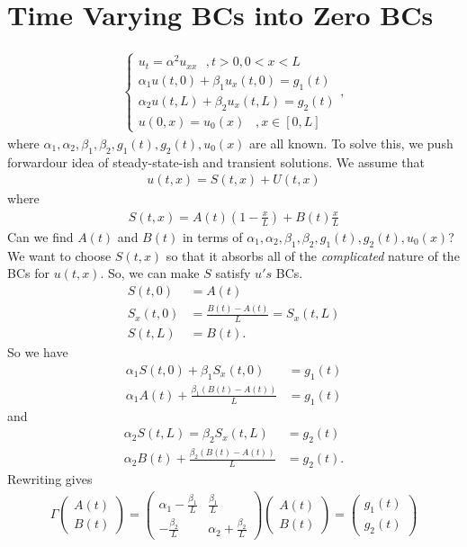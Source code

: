 \documentclass{book}
\theoremstyle{definition}
\begin{document}
\section{Time Varying BCs into Zero BCs}
\begin{align*}
\begin{cases}
u_t = \alpha^2u_{xx}\,\,\,\,, t>0,0<x<L\\
\alpha_1 u(t,0) + \beta_1 u_x(t,0) = g_1(t)\\
\alpha_2 u(t,L) + \beta_2 u_x(t,L) = g_2(t)\\
u(0,x) = u_0(x)\,\,\,\,\,, x\in[0,L]
\end{cases},
\end{align*}
where $\alpha_1,\alpha_2,\beta_1,\beta_2,g_1(t),g_2(t),u_0(x)$ are all known. To solve this, we push forwardour idea of steady-state-ish and transient solutions. We assume that 
\begin{align*}
u(t,x)= S(t,x) + U(t,x)
\end{align*}
where
\begin{align*}
S(t,x) = A(t)\left( 1 - \frac{x}{L}\right) + B(t)\frac{x}{L}
\end{align*}
Can we find $A(t)$ and $B(t)$ in terms of $\alpha_1,\alpha_2,\beta_1,\beta_2,g_1(t),g_2(t),u_0(x)$? We want to choose $S(t,x)$ so that it absorbs all of the \textit{complicated} nature of the BCs for $u(t,x)$. So, we can make $S$ satisfy $u's$ BCs. 
\begin{align*}
S(t,0)&= A(t)\\
S_x(t,0) &= \frac{B(t) - A(t)}{L}  = S_x(t,L)\\
S(t,L) &= B(t).
\end{align*}
So we have
\begin{align*}
\alpha_1 S(t,0) + \beta_1 S_x(t,0) &= g_1(t)\\
\alpha_1 A(t) + \frac{\beta_1(B(t) - A(t))}{L} &= g_1(t)
\end{align*}
and
\begin{align*}
\alpha_2 S(t,L) = \beta_2 S_x(t,L) &= g_2(t)\\
\alpha_2 B(t) + \frac{\beta_2(B(t) - A(t))}{L} &= g_2(t).
\end{align*}
Rewriting gives
\begin{align*}
\Gamma\begin{pmatrix}
A(t)\\B(t)
\end{pmatrix} = 
\begin{pmatrix}
\alpha_1 - \frac{\beta_1}{L} & \frac{\beta_1}{L}\\
- \frac{\beta_2}{L} & \alpha_2  + \frac{\beta_2}{L}
\end{pmatrix}
\begin{pmatrix}
A(t)\\B(t)
\end{pmatrix}
=
\begin{pmatrix}
g_1(t)\\g_2(t)
\end{pmatrix}
\end{align*}
\end{document}
